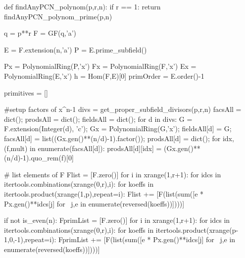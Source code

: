 \begin{sagecode}[caption={[\texttt{findAnyPCN\_polynom} aus 
 \url{../Sage/findAnyPCN_trinom.spyx}]Aus \url{../Sage/findAnyPCN_trinom.spyx}},
  label=lst:findAnyPCN_polynom]
def findAnyPCN_polynom(p,r,n):
    if r == 1:
        return findAnyPCN_polynom_prime(p,n)

    q = p**r
    F = GF(q,'a')

    E = F.extension(n,'a')
    P = E.prime_subfield()

    Px = PolynomialRing(P,'x')
    Fx = PolynomialRing(F,'x')
    Ex = PolynomialRing(E,'x')
    h = Hom(F,E)[0]
    primOrder = E.order()-1
   
    primitives = []
    
    #setup factors of x^n-1
    divs = get_proper_subfield_divisors(p,r,n)
    facsAll = dict();
    prodsAll = dict();
    fieldsAll = dict();
    for d in divs:
        G = F.extension(Integer(d), 'c');
        Gx = PolynomialRing(G,'x');
        fieldsAll[d] = G;
        facsAll[d] = list((Gx.gen()**(n/d)-1).factor());
        prodsAll[d] = dict();
        for idx,(f,mult) in enumerate(facsAll[d]):
            prodsAll[d][idx] = (Gx.gen()**(n/d)-1).quo_rem(f)[0]

    # list elements of F
    Flist = [F.zero()]
    for i in xrange(1,r+1):
        for idcs in itertools.combinations(xrange(0,r),i):
            for koeffs in itertools.product(xrange(1,p),repeat=i):
                Flist += [F(list(sum([e * Px.gen()**idcs[j] for \
                        j,e in enumerate(reversed(koeffs))])))]

    if not is_even(n):
        FprimList = [F.zero()]
        for i in xrange(1,r+1):
            for idcs in itertools.combinations(xrange(0,r),i):
                for koeffs in itertools.product(xrange(p-1,0,-1),repeat=i):
                    FprimList += [F(list(sum([e * Px.gen()**idcs[j] for \
                            j,e in enumerate(reversed(koeffs))])))]


\end{sagecode}
